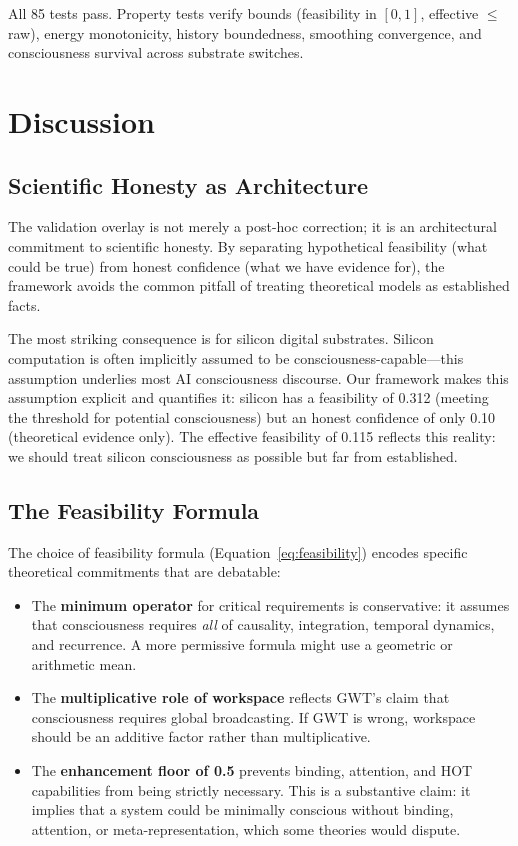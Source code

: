 \documentclass[12pt,a4paper]{article}
\begin{document}
All 85 tests pass. Property tests verify bounds (feasibility in $[0,1]$, effective $\leq$ raw), energy monotonicity, history boundedness, smoothing convergence, and consciousness survival across substrate switches.

\section{Discussion}

\subsection{Scientific Honesty as Architecture}

The validation overlay is not merely a post-hoc correction; it is an architectural commitment to scientific honesty. By separating hypothetical feasibility (what could be true) from honest confidence (what we have evidence for), the framework avoids the common pitfall of treating theoretical models as established facts.

The most striking consequence is for silicon digital substrates. Silicon computation is often implicitly assumed to be consciousness-capable---this assumption underlies most AI consciousness discourse. Our framework makes this assumption explicit and quantifies it: silicon has a feasibility of 0.312 (meeting the threshold for potential consciousness) but an honest confidence of only 0.10 (theoretical evidence only). The effective feasibility of 0.115 reflects this reality: we should treat silicon consciousness as possible but far from established.

\subsection{The Feasibility Formula}

The choice of feasibility formula (Equation~\ref{eq:feasibility}) encodes specific theoretical commitments that are debatable:

\begin{itemize}
    \item The \textbf{minimum operator} for critical requirements is conservative: it assumes that consciousness requires \emph{all} of causality, integration, temporal dynamics, and recurrence. A more permissive formula might use a geometric or arithmetic mean.
    \item The \textbf{multiplicative role of workspace} reflects GWT's claim that consciousness requires global broadcasting. If GWT is wrong, workspace should be an additive factor rather than multiplicative.
    \item The \textbf{enhancement floor of 0.5} prevents binding, attention, and HOT capabilities from being strictly necessary. This is a substantive claim: it implies that a system could be minimally conscious without binding, attention, or meta-representation, which some theories would dispute.
\end{itemize}
\end{document}
